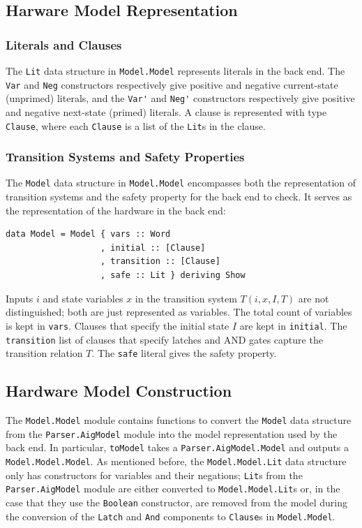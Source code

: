 \documentclass[12pt,a4paper,twoside,openright]{report}
\begin{document}
{{\subsection{Harware Model Representation}
\subsubsection{Literals and Clauses}
The \verb,Lit, data structure in \verb,Model.Model, represents literals in
the back end.
The \verb,Var, and \verb,Neg, constructors respectively give positive and negative
current-state (unprimed) literals, and the \verb,Var', and \verb,Neg', constructors
respectively give positive and negative next-state (primed) literals.
A clause is represented with type \verb,Clause,, where each \verb,Clause, is a
list of the \verb,Lit,s in the clause.

\subsubsection{Transition Systems and Safety Properties}
The \verb,Model, data structure in \verb,Model.Model, encompasses both
the representation of transition systems and the safety property for the back end to check.
It serves as the representation of the hardware in the back end:
\begin{lstlisting}
data Model = Model { vars :: Word
                   , initial :: [Clause]
                   , transition :: [Clause]
                   , safe :: Lit } deriving Show
\end{lstlisting}

Inputs $i$ and state variables $x$ in the transition system $T(i,x,I,T)$
are not distinguished; both are just represented as variables.
The total count of variables is kept in \verb,vars,.
Clauses that specify the initial state $I$ are kept in \verb,initial,.
The \verb,transition, list of clauses that specify latches and AND
gates capture the transition relation $T$.
The \verb,safe, literal gives the safety property.

\subsection{Hardware Model Construction}

The \verb,Model.Model, module contains functions to convert the \verb,Model, data
structure from the \verb,Parser.AigModel, module into the model representation
used by the back end. In particular, \verb,toModel, takes a \verb,Parser.AigModel.Model,
and outputs a \verb,Model.Model.Model,. As mentioned before, the \verb,Model.Model.Lit,
data structure only has constructors for variables and their negations; \verb,Lit,s from
the \verb,Parser.AigModel, module are either converted to \verb,Model.Model.Lit,s or, in the case
that they use the \verb,Boolean, constructor, are removed from the model during the conversion of
the \verb,Latch, and \verb,And, components to \verb,Clause,s in \verb,Model.Model,.

}}
\end{document}
